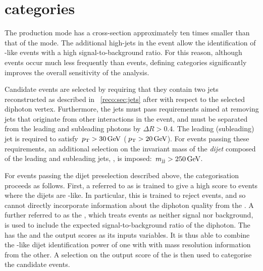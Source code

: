 \section{\VBFTag categories }
\label{cat:sec:vbftag}

The \VBF production mode has a cross-section approximately ten times smaller than that of the \ggH mode. The additional high-\pT jets in the event allow the identification of \VBF-like events with a high signal-to-background ratio. For this reason, although \VBF events occur much less frequently than \ggH events, defining \VBFTag categories significantly improves the overall sensitivity of the analysis.

Candidate \VBF events are selected by requiring that they contain two jets reconstructed as described in \Sec~\ref{reco:sec:jets} after \PFCHS with respect to the selected diphoton vertex. Furthermore, the jets must pass requirements aimed at removing jets that originate from other \pp interactions in the event, and must be separated from the leading and subleading photons by $\Delta R > 0.4$. The leading (subleading) jet is required to satisfy $\,p_\text{T} > 30 \,\text{Ge\hspace{-.08em}V}$ ($\,p_\text{T} > 20 \,\text{Ge\hspace{-.08em}V}$). For events passing these requirements, an additional selection on the invariant mass of the \emph{dijet} composed of the leading and subleading jets, \mjj, is imposed: $\,m_\text{jj} > 250\,\text{Ge\hspace{-.08em}V}$. %

For events passing the dijet preselection described above, the \VBFTag categorisation proceeds as follows. First, a \BDT referred to as \DiJetBdt is trained to give a high score to events where the dijets are \VBF-like. In particular, this is trained to reject \ggH events, and so cannot directly incorporate information about the diphoton quality from the \DiPhoBdt. %
A further \BDT referred to as the \DiPhoDiJetBdt, which treats \ggH events as neither signal nor background, is used to include the expected signal-to-background ratio of the diphoton. The \DiPhoDiJetBdt has the \DiPhoBdt and the \DiJetBdt output scores as its inputs variables. It is thus able to combine the \VBF-like dijet identification power of one \BDT with with mass resolution information from the other. %
A selection on the output score of the \DiPhoDiJetBdt is then used to categorise the candidate \VBFTag events.

